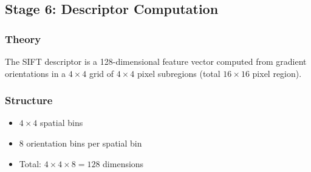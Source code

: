 \documentclass[12pt,a4paper]{article}
\begin{document}
\subsection{Stage 6: Descriptor Computation}

\subsubsection{Theory}
The SIFT descriptor is a 128-dimensional feature vector computed from gradient orientations in a $4 \times 4$ grid of $4 \times 4$ pixel subregions (total $16 \times 16$ pixel region).

\subsubsection{Structure}
\begin{itemize}
    \item $4 \times 4$ spatial bins
    \item 8 orientation bins per spatial bin
    \item Total: $4 \times 4 \times 8 = 128$ dimensions
\end{itemize}
\end{document}
